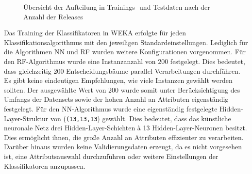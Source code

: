 \begin{figure}[ht]
  \qquad
  \qquad
  \caption{Übersicht der Aufteilung in Trainings- und Testdaten nach der Anzahl der Releases\label{fig:splits}}
\end{figure}

Das Training der Klassifikatoren in WEKA erfolgte für jeden Klassifikationsalgorithmus mit den jeweiligen Standardeinstellungen. Lediglich für die Algorithmen NN und RF wurden weitere Konfigurationen vorgenommen. Für den RF-Algorithmus wurde eine Instanzanzahl von 200 festgelegt. Dies bedeutet, dass gleichzeitig 200 Entscheidungsbäume parallel Verarbeitungen durchführen. Es gibt keine eindeutigen Empfehlungen, wie viele Instanzen gewählt werden sollten. Der ausgewählte Wert von 200 wurde somit unter Berücksichtigung des Umfangs der Datensets sowie der hohen Anzahl an Attributen eigenständig festgelegt. Für den NN-Algorithmus wurde eine eigenständig festgelegte Hidden-Layer-Struktur von (\texttt{(13,13,13}) gewählt. Dies bedeutet, dass das künstliche neuronale Netz drei Hidden-Layer-Schichten à 13 Hidden-Layer-Neuronen besitzt. Dies ermöglicht ihnen, die große Anzahl an Attributen effizienter zu verarbeiten. Darüber hinaus wurden keine Validierungsdaten erzeugt, da es nicht vorgesehen ist, eine Attributsauswahl durchzuführen oder weitere Einstellungen der Klassifikatoren anzupassen.

